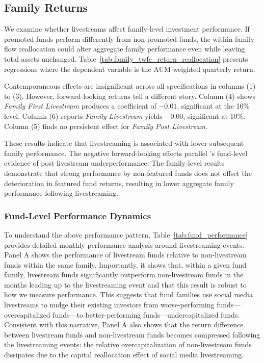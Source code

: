 \documentclass[12pt]{article}
\begin{document}
\subsection{Family Returns}\label{subsec:family_returns}

We examine whether livestreams affect family-level investment performance. If promoted funds perform differently from non-promoted funds, the within-family flow reallocation could alter aggregate family performance even while leaving total assets unchanged. Table~\ref{tab:family_twfe_return_reallocation} presents regressions where the dependent variable is the AUM-weighted quarterly return.

Contemporaneous effects are insignificant across all specifications in columns (1) to (3). However, forward-looking returns tell a different story. Column (4) shows \textit{Family First Livestream} produces a coefficient of $-0.01$, significant at the 10\% level. Column (6) reports \textit{Family Livestream} yields $-0.00$, significant at 10\%. Column (5) finds no persistent effect for \textit{Family Post Livestream}.

These results indicate that livestreaming is associated with lower subsequent family performance. The negative forward-looking effects parallel \citet{dehaan2025social}'s fund-level evidence of post-livestream underperformance. The family-level results demonstrate that strong performance by non-featured funds does not offset the deterioration in featured fund returns, resulting in lower aggregate family performance following livestreaming.

\subsubsection{Fund-Level Performance Dynamics}\label{subsec:performance_appendix}

To understand the above performance pattern, Table~\ref{tab:fund_performance} provides detailed monthly performance analysis around livestreaming events. Panel A shows the performance of livestream funds relative to non-livestream funds within the same family. Importantly, it shows that, within a given fund family, livestream funds significantly outperform non-livestream funds in the months leading up to the livestreaming event and that this result is robust to how we measure performance. This suggests that fund families use social media livestreams to nudge their existing investors from worse-performing funds---overcapitalized funds---to better-performing funds---undercapitalized funds. Consistent with this narrative, Panel A also shows that the return difference between livestream funds and non-livestream funds becomes compressed following the livestreaming events: the relative overcapitalization of non-livestream funds dissipates due to the capital reallocation effect of social media livestreaming.
\end{document}
